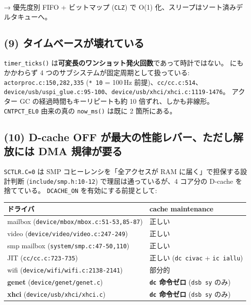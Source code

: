 \documentclass[a4paper,11pt]{ltjsarticle}
\begin{document}
→ 優先度別 FIFO + ビットマップ (\texttt{CLZ}) で O(1) 化、スリープはソート済みデルタキューへ。

\subsection{(9) タイムベースが壊れている}

\texttt{timer\_ticks()} は\textbf{可変長のワンショット発火回数}であって時計ではない。
にもかかわらず 4 つのサブシステムが固定周期として扱っている:
\texttt{actorproc.c:150,282,335} (\texttt{* 10} = 100\,Hz 前提)、\texttt{cc/cc.c:514}、
\texttt{device/usb/uspi\_glue.c:95-100}、\texttt{device/usb/xhci/xhci.c:1119-1476}。
アクター GC の経過時間もキーリピートも約 10 倍ずれ、しかも非線形。
\texttt{CNTPCT\_EL0} 由来の真の \texttt{now\_ms()} は既に 2 箇所にある。

\subsection{(10) D-cache OFF が最大の性能レバー、ただし解放には DMA 規律が要る}

\texttt{SCTLR.C=0} は SMP コヒーレンシを「全アクセスが RAM に届く」で担保する設計判断
(\texttt{include/smp.h:10-12}) で理屈は通っているが、4 コア分の D-cache を捨てている。
\texttt{DCACHE\_ON} を有効にする前提として:

\begin{center}\small
\begin{tabular}{@{}l l@{}}
\toprule
\textbf{ドライバ} & \textbf{cache maintenance}\\ \midrule
mailbox (\texttt{device/mbox/mbox.c:51-53,85-87}) & 正しい\\
video (\texttt{device/video/video.c:247-249})     & 正しい\\
smp mailbox (\texttt{system/smp.c:47-50,110})     & 正しい\\
JIT (\texttt{cc/cc.c:723-735})                    & 正しい (\texttt{dc civac} + \texttt{ic iallu})\\
wifi (\texttt{device/wifi/wifi.c:2138-2141})      & 部分的\\
\textbf{genet} (\texttt{device/genet/genet.c})    & \textbf{\texttt{dc} 命令ゼロ} (\texttt{dsb sy} のみ)\\
\textbf{xhci} (\texttt{device/usb/xhci/xhci.c})   & \textbf{\texttt{dc} 命令ゼロ} (\texttt{dsb sy} のみ)\\
\bottomrule
\end{tabular}
\end{center}
\end{document}
